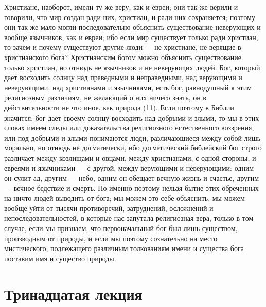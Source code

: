 \documentclass[12pt]{article}
\begin{document}
Христиане, наоборот, имели ту же веру, как и евреи; они так же верили и говорили, что мир создан ради них, христиан, и ради них сохраняется; поэтому они так же мало могли последовательно объяснить существование неверующих и вообще язычников, как и евреи; ибо если мир существует только ради христиан, то зачем и почему существуют другие люди --- не христиане, не верящие в христианского бога? Христианским богом можно объяснить существование только христиан, но отнюдь не язычников и не неверующих людей. Бог, который дает восходить солнцу над праведными и неправедными, над верующими и неверующими, над христианами и язычниками, есть бог, равнодушный к этим религиозным различиям, не желающий о них ничего знать, он в действительности не что иное, как природа \hyperlink{11}{(11)}\hypertarget{b11}{}. Если поэтому в Библии значится: бог дает своему солнцу восходить над добрыми и злыми, то мы в этих словах имеем следы или доказательства религиозного естественного воззрения, или под добрыми и злыми понимаются люди, различающиеся между собой лишь морально, но отнюдь не догматически, ибо догматический библейский бог строго различает между козлищами и овцами, между христианами, с одной стороны, и евреями и язычниками --- с другой, между верующими и неверующими: одним он сулит ад, другим --- небо, одним он обещает вечную жизнь и счастье, другим --- вечное бедствие и смерть. Но именно поэтому нельзя бытие этих обреченных на ничто людей выводить от бога; мы можем это себе объяснить, мы можем вообще уйти от тысячи противоречий, затруднений, осложнений и непоследовательностей, в которые нас запутала религиозная вера, только в том случае, если мы признаем, что первоначальный бог был лишь существом, производным от природы, и если мы поэтому сознательно на место мистического, подлежащего различным толкованиям имени и существа бога поставим имя и существо природы.

{}
\section*{Тринадцатая лекция}
\end{document}

